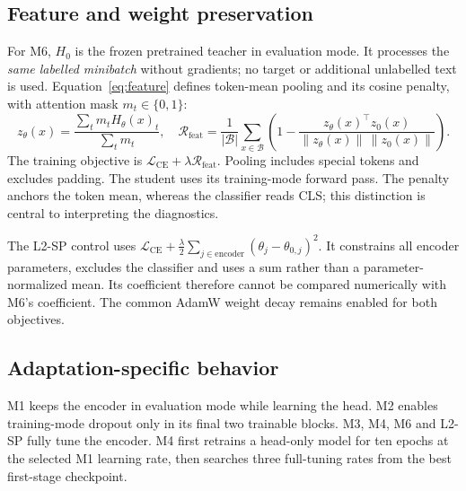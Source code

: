 \documentclass[a4paper,10pt]{article}
\begin{document}
\begin{center}

\label{tab:methods}
\end{center}

\subsection{Feature and weight preservation}
For M6, $H_0$ is the frozen pretrained teacher in evaluation mode. It processes the \emph{same labelled minibatch} without gradients; no target or additional unlabelled text is used. Equation~\ref{eq:feature} defines token-mean pooling and its cosine penalty, with attention mask $m_t\in\{0,1\}$:
\begin{equation}
 z_\theta(x)=\frac{\sum_t m_t H_\theta(x)_t}{\sum_t m_t},\quad
 \mathcal R_{\mathrm{feat}}=\frac{1}{|\mathcal B|}\sum_{x\in\mathcal B}
 \left(1-\frac{z_\theta(x)^\top z_0(x)}{\|z_\theta(x)\|\,\|z_0(x)\|}\right).
\label{eq:feature}
\end{equation}
The training objective is $\mathcal L_{\mathrm{CE}}+\lambda\mathcal R_{\mathrm{feat}}$. Pooling includes special tokens and excludes padding. The student uses its training-mode forward pass. The penalty anchors the token mean, whereas the classifier reads CLS; this distinction is central to interpreting the diagnostics.

The L2-SP control uses $\mathcal L_{\mathrm{CE}}+\frac{\lambda}{2}\sum_{j\in\mathrm{encoder}}(\theta_j-\theta_{0,j})^2$. It constrains all encoder parameters, excludes the classifier and uses a sum rather than a parameter-normalized mean. Its coefficient therefore cannot be compared numerically with M6's coefficient. The common AdamW weight decay remains enabled for both objectives.

\subsection{Adaptation-specific behavior}
M1 keeps the encoder in evaluation mode while learning the head. M2 enables training-mode dropout only in its final two trainable blocks. M3, M4, M6 and L2-SP fully tune the encoder. M4 first retrains a head-only model for ten epochs at the selected M1 learning rate, then searches three full-tuning rates from the best first-stage checkpoint.
\end{document}
